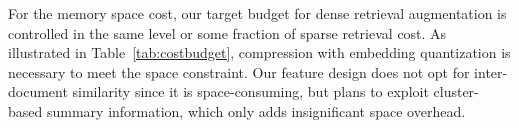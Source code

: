 For the memory space cost,  our target budget for  dense retrieval augmentation is controlled in  the same level or some fraction of  sparse retrieval cost.
As illustrated in  Table~\ref{tab:costbudget}, compression with embedding  quantization is necessary to meet the space constraint.
Our feature design does not opt for  
inter-document similarity since it is space-consuming,
but  plans to exploit cluster-based summary information, 
which  only adds  insignificant  space overhead.  

